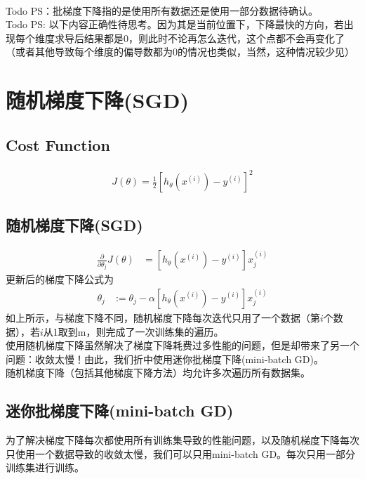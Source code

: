 \\ Todo PS：批梯度下降指的是使用所有数据还是使用一部分数据待确认。
\\ Todo PS: 以下内容正确性待思考。因为其是当前位置下，下降最快的方向，若出现每个维度求导后结果都是0，则此时不论再怎么迭代，这个点都不会再变化了（或者其他导致每个维度的偏导数都为0的情况也类似，当然，这种情况较少见）

\section{随机梯度下降(SGD)}
\subsection{Cost Function}
\begin{equation}\begin{aligned}
	J(\theta) = \frac{1}{2} \left[h_{\theta} {(x^{(i)})} - y^{(i)}\right]^2
\end{aligned}\end{equation}

\subsection{随机梯度下降(SGD)}
\begin{equation}\begin{aligned}
      \frac{\partial} {\partial \theta_j} J(\theta) &= \left[ h_\theta(x^{(i)}) - y^{(i)} \right]x_j^{(i)}
\end{aligned}\end{equation}
更新后的梯度下降公式为
\begin{equation}\begin{aligned}
	\theta_j &:= \theta_j - \alpha\left[ h_\theta(x^{(i)}) - y^{(i)} \right]x_j^{(i)}
\end{aligned}\end{equation}
如上所示，与梯度下降不同，随机梯度下降每次迭代只用了一个数据（第$i$个数据），若$i$从1取到m，则完成了一次训练集的遍历。\\
使用随机梯度下降虽然解决了梯度下降耗费过多性能的问题，但是却带来了另一个问题：收敛太慢！由此，我们折中使用迷你批梯度下降(mini-batch GD)。\\
随机梯度下降（包括其他梯度下降方法）均允许多次遍历所有数据集。

\subsection{迷你批梯度下降(mini-batch GD)}
为了解决梯度下降每次都使用所有训练集导致的性能问题，以及随机梯度下降每次只使用一个数据导致的收敛太慢，我们可以只用mini-batch GD。每次只用一部分训练集进行训练。











